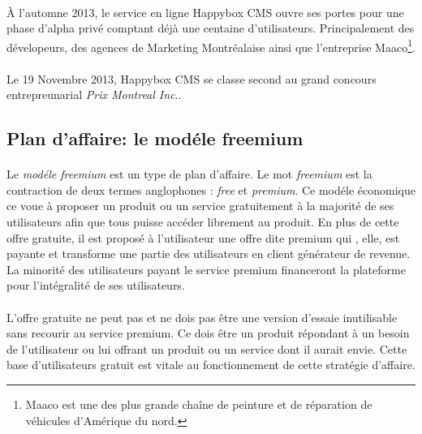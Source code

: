 \documentclass[11pt, a4paper ]{article}
\begin{document}
\paragraph{}
À l'automne 2013, le service en ligne Happybox CMS ouvre ses portes pour une phase d'alpha privé comptant déjà une centaine d'utilisateurs. Principalement des dévelopeurs, des agences de Marketing Montréalaise ainsi que l'entreprise Maaco\footnote{Maaco est une des plus grande chaîne de peinture et de réparation de véhicules d'Amérique du nord.}.

\paragraph{}
Le 19 Novembre 2013, Happybox CMS se classe second au grand concours entrepreunarial \emph{Prix Montreal Inc}..


			\subsection{Plan d'affaire: le modéle freemium} %

\paragraph{}
Le \emph{modéle freemium} est un type de plan d'affaire. Le mot \emph{freemium} est la contraction de deux termes anglophones : \emph{free} et \emph{premium}. Ce modéle économique ce voue à proposer un produit ou un service gratuitement à la majorité de ses utilisateurs afin que tous puisse accéder librement au produit. En plus de cette offre gratuite, il est proposé à l'utilisateur une offre dite premium qui , elle, est payante et transforme une partie des utilisateurs en client générateur de revenue. La minorité des utilisateurs payant le service premium financeront la plateforme pour l'intégralité de ses utilisateurs.


\paragraph{} %
L'offre gratuite ne peut pas et ne dois pas être une version d'essaie inutilisable sans recourir au service premium. Ce dois être un produit répondant à un besoin de l'utilisateur ou lui offrant un produit ou un service dont il aurait envie. Cette base d'utilisateurs gratuit est vitale au fonctionnement de cette stratégie d'affaire.
\end{document}
